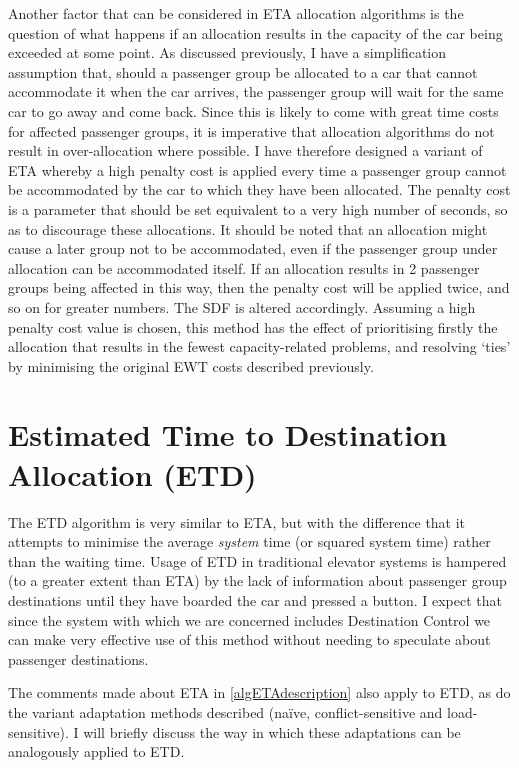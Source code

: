 \documentclass{UoYCSproject}
\begin{document}
Another factor that can be considered in ETA allocation algorithms is the question of what happens if an allocation results in the capacity of the car being exceeded at some point.  As discussed previously, I have a simplification assumption that, should a passenger group be allocated to a car that cannot accommodate it when the car arrives, the passenger group will wait for the same car to go away and come back.  Since this is likely to come with great time costs for affected passenger groups, it is imperative that allocation algorithms do not result in over-allocation where possible.  I have therefore designed a variant of ETA whereby a high penalty cost is applied every time a passenger group cannot be accommodated by the car to which they have been allocated.  The penalty cost is a parameter that should be set equivalent to a very high number of seconds, so as to discourage these allocations.  It should be noted that an allocation might cause a later group not to be accommodated, even if the passenger group under allocation can be accommodated itself.  If an allocation results in 2 passenger groups being affected in this way, then the penalty cost will be applied twice, and so on for greater numbers.  The SDF is altered accordingly.  Assuming a high penalty cost value is chosen, this method has the effect of prioritising firstly the allocation that results in the fewest capacity-related problems, and resolving `ties' by minimising the original EWT costs described previously.

\section{Estimated Time to Destination Allocation (ETD)}
\label{algETDdescription}

The ETD algorithm is very similar to ETA, but with the difference that it attempts to minimise the average \textit{system} time (or squared system time) rather than the waiting time.  Usage of ETD in traditional elevator systems is hampered (to a greater extent than ETA) by the lack of information about passenger group destinations until they have boarded the car and pressed a button.  I expect that since the system with which we are concerned includes Destination Control we can make very effective use of this method without needing to speculate about passenger destinations.

The comments made about ETA in \autoref{algETAdescription} also apply to ETD, as do the variant adaptation methods described (na\"{i}ve, conflict-sensitive and load-sensitive).  I will briefly discuss the way in which these adaptations can be analogously applied to ETD.
\end{document}
